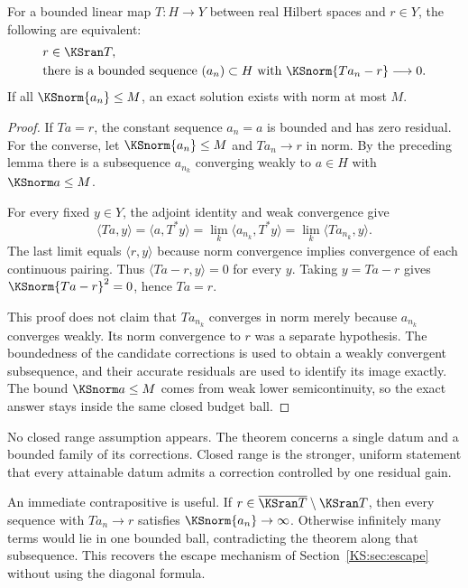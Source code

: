 \begin{KStheorem}\label{KS:WR01}
For a bounded linear map $T:H\to Y$ between real Hilbert spaces and $r\in Y$, the following are equivalent:
\[
 \begin{split}
 &r\in\KSran T,\\
 &\text{there is a bounded sequence }(a_n)\subset H
       \text{ with }\KSnorm{Ta_n-r}\longrightarrow0.
 \end{split}
\]
If all $\KSnorm{a_n}\le M$, an exact solution exists with norm at most $M$.
\end{KStheorem}
\begin{proof}
If $Ta=r$, the constant sequence $a_n=a$ is bounded and has zero residual. For the converse, let $\KSnorm{a_n}\le M$ and $Ta_n\to r$ in norm. By the preceding lemma there is a subsequence $a_{n_k}$ converging weakly to $a\in H$ with $\KSnorm a\le M$.

For every fixed $y\in Y$, the adjoint identity and weak convergence give
\[
 \langle Ta,y\rangle
 =\langle a,T^*y\rangle
 =\lim_k\langle a_{n_k},T^*y\rangle
 =\lim_k\langle Ta_{n_k},y\rangle.
\]
The last limit equals $\langle r,y\rangle$ because norm convergence implies convergence of each continuous pairing. Thus $\langle Ta-r,y\rangle=0$ for every $y$. Taking $y=Ta-r$ gives $\KSnorm{Ta-r}^2=0$, hence $Ta=r$.

This proof does not claim that $Ta_{n_k}$ converges in norm merely because $a_{n_k}$ converges weakly. Its norm convergence to $r$ was a separate hypothesis. The boundedness of the candidate corrections is used to obtain a weakly convergent subsequence, and their accurate residuals are used to identify its image exactly. The bound $\KSnorm a\le M$ comes from weak lower semicontinuity, so the exact answer stays inside the same closed budget ball.
\end{proof}

No closed range assumption appears. The theorem concerns a single datum and a bounded family of its corrections. Closed range is the stronger, uniform statement that every attainable datum admits a correction controlled by one residual gain.

An immediate contrapositive is useful. If $r\in\overline{\KSran T}\setminus\KSran T$, then every sequence with $Ta_n\to r$ satisfies $\KSnorm{a_n}\to\infty$. Otherwise infinitely many terms would lie in one bounded ball, contradicting the theorem along that subsequence. This recovers the escape mechanism of Section~\ref{KS:sec:escape} without using the diagonal formula.

